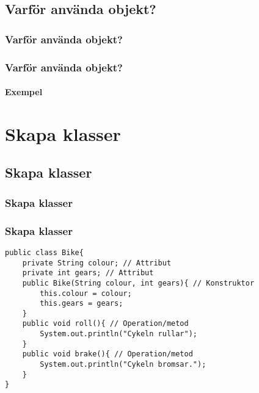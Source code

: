 \documentclass[aspectratio=169]{beamer}
\begin{document}
\subsection{Varför använda objekt?}

\begin{frame}
    \frametitle{Varför använda objekt?}



\end{frame}

\begin{frame}
    \frametitle{Varför använda objekt?}
    \framesubtitle{Exempel}




\end{frame}

\section{Skapa klasser}

\subsection{Skapa klasser}

\begin{frame}
    \frametitle{Skapa klasser}




\end{frame}

\begin{frame}[fragile]
    \frametitle{Skapa klasser}

    \begin{lstlisting}
public class Bike{
    private String colour; // Attribut
    private int gears; // Attribut
    public Bike(String colour, int gears){ // Konstruktor
        this.colour = colour;
        this.gears = gears;
    }
    public void roll(){ // Operation/metod
        System.out.println("Cykeln rullar");
    }
    public void brake(){ // Operation/metod
        System.out.println("Cykeln bromsar.");
    }
}
    \end{lstlisting}

\end{frame}
\end{document}

